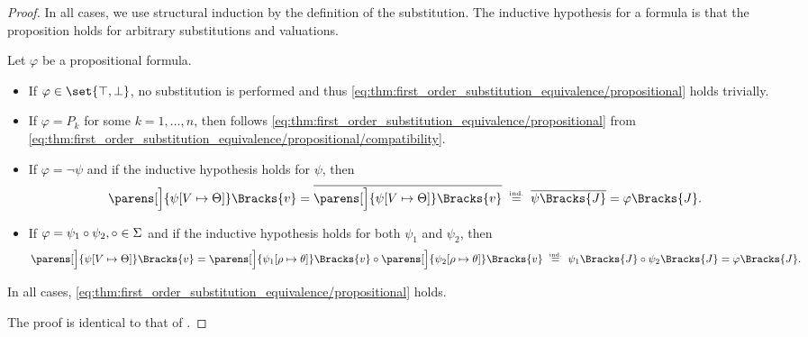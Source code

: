 \begin{proof}
  In all cases, we use structural induction by the definition of the substitution. The inductive hypothesis for a formula is that the proposition holds for arbitrary substitutions and valuations.

   Let \( \varphi \) be a propositional formula.
  \begin{itemize}
    \item If \( \varphi \in \set{ \top, \bot } \), no substitution is performed and thus \eqref{eq:thm:first_order_substitution_equivalence/propositional} holds trivially.

    \item If \( \varphi = P_k \) for some \( k = 1, \ldots, n \), then follows \eqref{eq:thm:first_order_substitution_equivalence/propositional} from \eqref{eq:thm:first_order_substitution_equivalence/propositional/compatibility}.

    \item If \( \varphi = \neg \psi \) and if the inductive hypothesis holds for \( \psi \), then
    \begin{equation*}
      \parens[\Big]{ \psi[V \mapsto \Theta] }\Bracks{v}
      =
      \overline{\parens[\Big]{ \psi[V \mapsto \Theta] }\Bracks{v}}
      \reloset {\T{ind.}} =
      \overline{\psi \Bracks{J}}
      =
      \varphi \Bracks{J}.
    \end{equation*}

    \item If \( \varphi = \psi_1 \mathbin \circ \psi_2, \mathbin \circ \in \Sigma \) and if the inductive hypothesis holds for both \( \psi_1 \) and \( \psi_2 \), then
    \begin{equation*}
      \parens[\Big]{ \psi[V \mapsto \Theta] }\Bracks{v}
      =
      \parens[\Big]{ \psi_1[\rho \mapsto \theta] }\Bracks{v} \bincirc \parens[\Big]{ \psi_2[\rho \mapsto \theta] }\Bracks{v}
      \reloset {\T{ind.}} =
      \psi_1 \Bracks{J} \bincirc \psi_2\Bracks{J}
      =
      \varphi\Bracks{J}.
    \end{equation*}
  \end{itemize}

  In all cases, \eqref{eq:thm:first_order_substitution_equivalence/propositional} holds.

   The proof is identical to that of .


\end{proof}
